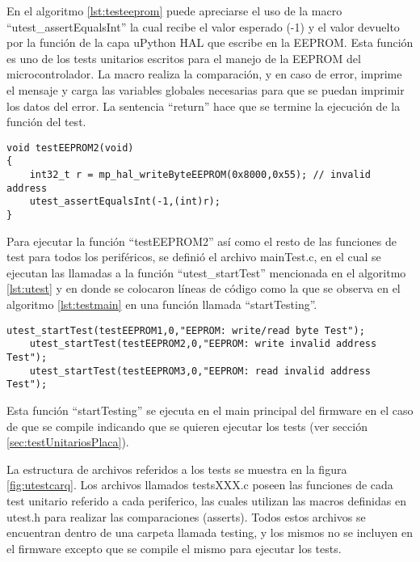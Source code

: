 En el algoritmo \ref{lst:testeeprom} puede apreciarse el uso de la macro “utest\_assertEqualsInt” la cual recibe el valor esperado (-1) y el valor devuelto por la función de la capa uPython HAL que escribe en la EEPROM. Esta función es uno de los tests unitarios escritos para el manejo de la EEPROM del microcontrolador. La macro realiza la comparación, y en caso de error, imprime el mensaje y carga las variables globales necesarias para que se puedan imprimir los datos del error. La sentencia “return” hace que se termine la ejecución de la función del test.

\begin{lstlisting}[label={lst:testeeprom},caption=Ejemplo de un test unitario para la EEPROM usando una dirección inválida.]
void testEEPROM2(void)
{
	int32_t r = mp_hal_writeByteEEPROM(0x8000,0x55); // invalid address
	utest_assertEqualsInt(-1,(int)r);
}
\end{lstlisting}

Para ejecutar la función “testEEPROM2” así como el resto de las funciones de test para todos los periféricos, se definió el archivo mainTest.c, en el cual se ejecutan las llamadas a la función “utest\_startTest” mencionada en el algoritmo \ref{lst:utest} y en donde se colocaron líneas de código como la que se observa en el algoritmo \ref{lst:testmain} en una función llamada “startTesting”. 

\begin{lstlisting}[label={lst:testmain},caption=Ejemplo de ejecución de funciones de test en archivo mainTest.c.]
	utest_startTest(testEEPROM1,0,"EEPROM: write/read byte Test");
	utest_startTest(testEEPROM2,0,"EEPROM: write invalid address Test");
	utest_startTest(testEEPROM3,0,"EEPROM: read invalid address Test");
\end{lstlisting}

Esta función “startTesting” se ejecuta en el main principal del firmware en el caso de que se compile indicando que se quieren ejecutar los tests (ver sección \ref{sec:testUnitariosPlaca}).

La estructura de archivos referidos a los tests se muestra en la figura \ref{fig:utestcarq}. Los archivos llamados testsXXX.c poseen las funciones de cada test unitario referido a cada periferico, las cuales utilizan las macros definidas en utest.h para realizar las comparaciones (asserts). Todos estos archivos se encuentran dentro de una carpeta llamada testing, y los mismos no se incluyen en el firmware excepto que se compile el mismo para ejecutar los tests.

